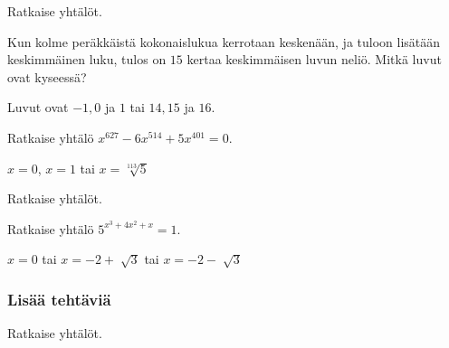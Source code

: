 \begin{tehtavasivu}
\begin{tehtava}
    Ratkaise yhtälöt.
    \begin{vastaus}
    \end{vastaus}
\end{tehtava}

\begin{tehtava}
Kun kolme peräkkäistä kokonaislukua kerrotaan keskenään, ja tuloon lisätään keskimmäinen luku, tulos on $15$ kertaa keskimmäisen luvun neliö. Mitkä luvut ovat kyseessä?
    \begin{vastaus}
	Luvut ovat $-1, 0$ ja $1$ tai $14, 15$ ja $16$.
    \end{vastaus}
\end{tehtava}

\begin{tehtava}
	Ratkaise yhtälö $x^{627} - 6x^{514} + 5x^{401} = 0$.
	\begin{vastaus}
		$x = 0$, $x = 1$ tai $x = \sqrt[113]{5}$
	\end{vastaus}
\end{tehtava}

\begin{tehtava}
    Ratkaise yhtälöt.
    \begin{vastaus}
    \end{vastaus}
\end{tehtava}

\begin{tehtava}
 	Ratkaise yhtälö $5^{x^3+4x^2+x}=1$. 
	\begin{vastaus}
	$x=0$ tai $x=-2 + \sqrt[]{3}$ tai $x=-2 - \sqrt[]{3}$
	\end{vastaus}
\end{tehtava}

\subsubsection*{Lisää tehtäviä}

\begin{tehtava}
    Ratkaise yhtälöt.
    \begin{vastaus}
    \end{vastaus}
\end{tehtava}


\end{tehtavasivu}
